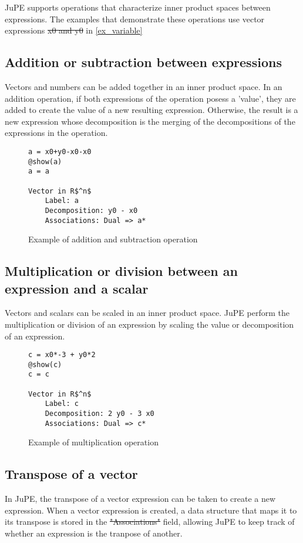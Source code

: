 JuPE supports operations that characterize inner product spaces between expressions. The examples that demonstrate these operations use vector expressions \sout{x0 and y0}  in \ref{ex_variable}

\subsection*{Addition or subtraction between expressions}

Vectors and numbers can be added together in an inner product space. In an addition operation, if both expressions of the operation posess a 'value', they are added to create the value of a new resulting expression. Otherwise, the result is a new expression whose decomposition is the merging of the decompositions of the expressions in the operation.
\begin{figure}[!h]
	\begin{lstlisting}[mathescape]
a = x0+y0-x0-x0
@show(a)
a = a

Vector in R$^n$
	Label: a
	Decomposition: y0 - x0
	Associations: Dual => a*
	\end{lstlisting}
	\caption{Example of addition and subtraction operation}
	\label{ex_addsub}
\end{figure}

\subsection*{Multiplication or division between an expression and a scalar} 
Vectors and scalars can be scaled in an inner product space. JuPE perform the multiplication or division of an expression by scaling the value or decomposition of an expression.
\begin{figure}[!h]
	\begin{lstlisting}[mathescape]
c = x0*-3 + y0*2
@show(c)
c = c

Vector in R$^n$
	Label: c
	Decomposition: 2 y0 - 3 x0
	Associations: Dual => c*

	\end{lstlisting}
	\caption{Example of multiplication operation}
	\label{ex_scalar}
\end{figure}

\subsection*{Transpose of a vector}
In JuPE, the transpose of a vector expression can be taken to create a new expression. When a vector expression is created, a data structure that maps it to its transpose is stored in the \sout{"Associations"}  field, allowing JuPE to keep track of whether an expression is the tranpose of another.

